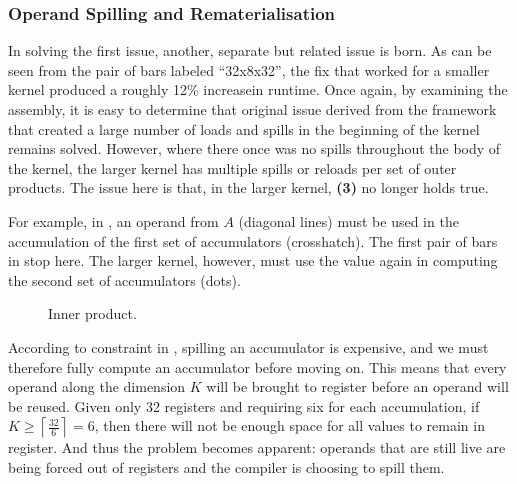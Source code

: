 \documentclass[\main/thesis.tex]{subfiles}
\begin{document}
\subsubsection{Operand Spilling and Rematerialisation}
In solving the first issue, another, separate but related issue is born.
As can be seen from the pair of bars labeled ``32x8x32'', the fix that worked for a smaller kernel produced a roughly 12\% increase\footnotemark in runtime.
Once again, by examining the assembly, it is easy to determine that original issue derived from the framework that created a large number of loads and spills in the beginning of the kernel remains solved.
However, where there once was no spills throughout the body of the kernel, the larger kernel has multiple spills or reloads per set of outer products.
The issue here is that, in the larger kernel, \textbf{(3)} no longer holds true.

For example, in , an operand from $A$ (diagonal lines) must be used in the accumulation of the first set of accumulators (crosshatch).
The first pair of bars in  stop here.
The larger kernel, however, must use the value again in computing the second set of accumulators (dots).

\begin{figure}[t]
  \centering
  \caption{Inner product.}
  \label{fig:opReuse}
\end{figure}

According to constraint  in , spilling an accumulator is expensive, and we must therefore fully compute an accumulator before moving on.
This means that every operand along the dimension $K$ will be brought to register before an operand will be reused.
Given only 32 registers and requiring six for each accumulation, if $K \geq \left\lceil \frac{32}{6} \right\rceil = 6$, then there will not be enough space for all values to remain in register.
And thus the problem becomes apparent: operands that are still \gls{live} are being forced out of registers and the compiler is choosing to spill them.
\end{document}
